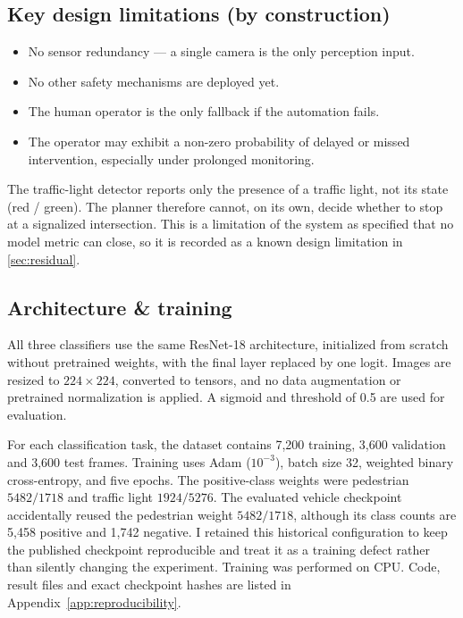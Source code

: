 \documentclass[nologo,a4paper,12pt]{article}
\begin{document}
\subsection{Key design limitations (by construction)}

\begin{itemize}
  \item No sensor redundancy --- a single camera is the only perception input.
  \item No other safety mechanisms are deployed yet.
  \item The human operator is the only fallback if the automation fails.
  \item The operator may exhibit a non-zero probability of delayed or missed intervention, especially under prolonged monitoring.
\end{itemize}

The traffic-light detector reports only the presence of a traffic light, not its state (red / green). The planner therefore cannot, on its own, decide whether to stop at a signalized intersection. This is a limitation of the system as specified that no model metric can close, so it is recorded as a known design limitation in \cref{sec:residual}.

\subsection{Architecture \& training}

All three classifiers use the same ResNet-18 architecture, initialized from scratch without
pretrained weights, with the final layer replaced by one logit. Images are resized to
$224\times224$, converted to tensors, and no data augmentation or pretrained normalization is
applied. A sigmoid and threshold of 0.5 are used for evaluation.

For each classification task, the dataset contains 7,200 training, 3,600 validation and 3,600
test frames. Training uses Adam ($10^{-3}$), batch size 32, weighted binary cross-entropy, and
five epochs. The positive-class weights were pedestrian $5482/1718$ and traffic light
$1924/5276$. The evaluated vehicle
checkpoint accidentally reused the pedestrian weight $5482/1718$, although its class counts are
5,458 positive and 1,742 negative. I retained this historical configuration to keep the published
checkpoint reproducible and treat it as a training defect rather than silently changing the
experiment. Training was performed on CPU. Code, result files and exact checkpoint hashes are
listed in Appendix~\ref{app:reproducibility}.
\end{document}
